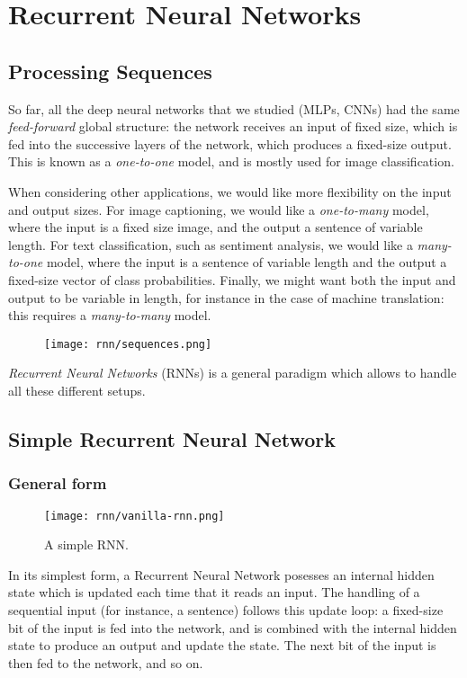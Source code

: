 \section{Recurrent Neural Networks}
\subsection{Processing Sequences}
So far, all the deep neural networks that we studied (MLPs, CNNs) had the same \emph{feed-forward} global structure: the network receives an input of fixed size, which is fed into the successive layers of the network, which produces a fixed-size output. This is known as a \emph{one-to-one} model, and is mostly used for image classification.

When considering other applications, we would like more flexibility on the input and output sizes. For image captioning, we would like a \emph{one-to-many} model, where the input is a fixed size image, and the output a sentence of variable length. For text classification, such as sentiment analysis, we would like a \emph{many-to-one} model, where the input is a sentence of variable length and the output a fixed-size vector of class probabilities. Finally, we might want both the input and output to be variable in length, for instance in the case of machine translation: this requires a \emph{many-to-many} model.

\begin{figure}[H]
    \centering
    \texttt{[image: rnn/sequences.png]}
\end{figure}

\emph{Recurrent Neural Networks} (RNNs) is a general paradigm which allows to handle all these different setups.

\subsection{Simple Recurrent Neural Network}
\subsubsection{General form}
\begin{wrapfigure}{r}{0.2\textwidth}
    \centering
    \texttt{[image: rnn/vanilla-rnn.png]}
    \caption{A simple RNN.}
\end{wrapfigure}
In its simplest form, a Recurrent Neural Network posesses an internal hidden state which is updated each time that it reads an input. The handling of a sequential input (for instance, a sentence) follows this update loop: a fixed-size bit of the input is fed into the network, and is combined with the internal hidden state to produce an output and update the state. The next bit of the input is then fed to the network, and so on.

